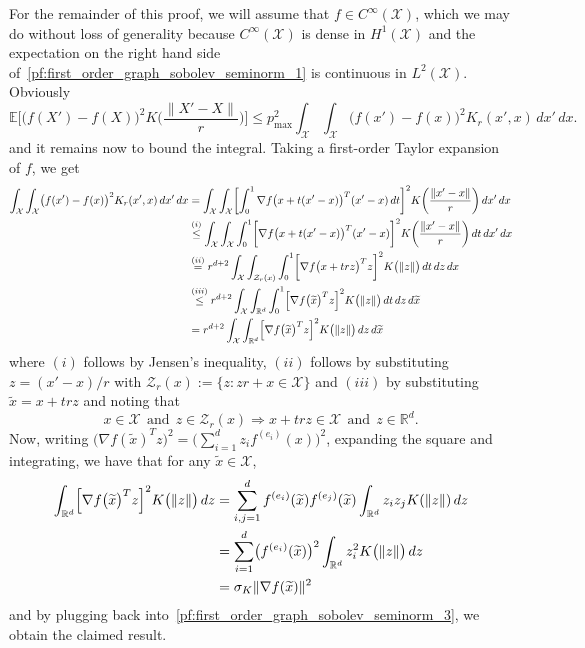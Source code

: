 \documentclass{article}
\newcommand{\Reals}{\mathbb{R}}
\newcommand{\1}{\mathbf{1}}
\newcommand{\Rd}{\Reals^d}
\newcommand{\Xset}{\mathcal{X}}
\newcommand{\Leb}{L}
\newcommand{\mc}[1]{\mathcal{#1}}
\newcommand{\Ebb}{\mathbb{E}}
\newcommand{\wt}[1]{\widetilde{#1}}
\theoremstyle{alden}
\theoremstyle{aldenthm}
\theoremstyle{definition}
\theoremstyle{remark}
\begin{document}
For the remainder of this proof, we will assume that $f \in C^{\infty}(\Xset)$, which we may do without loss of generality because $C^{\infty}(\Xset)$ is dense in $H^1(\Xset)$ and the expectation on the right hand side of~\eqref{pf:first_order_graph_sobolev_seminorm_1} is continuous in $\Leb^2(\Xset)$. Obviously
\begin{equation}
\Ebb\biggl[\bigl(f(X') - f(X)\bigr)^2K\biggl(\frac{\|X' - X\|}{r}\biggr)\biggr] \leq p_{\max}^2 \int_{\Xset} \int_{\Xset} \bigl(f(x') - f(x)\bigr)^2 K_r(x',x) \,dx' \,dx. \label{pf:first_order_graph_sobolev_seminorm_2}
\end{equation}
and it remains now to bound the integral. Taking a first-order Taylor expansion of $f$, we get
\begin{align}
\int_{\Xset} \int_{\Xset} \bigl(f(x') - f(x)\bigr)^2 K_r(x',x) \,dx' \,dx & = \int_{\Xset} \int_{\Xset} \biggl[\int_{0}^{1} \nabla f\bigl(x + t(x' - x)\bigr)^T (x' - x)\,dt\biggr]^2 K\biggl(\frac{\|x' - x\|}{r}\biggr) \,dx' \,dx \nonumber \\
& \overset{(i)}{\leq} \int_{\Xset} \int_{\Xset} \int_{0}^{1} \biggl[\nabla f\bigl(x + t(x' - x)\bigr)^T (x' - x)\biggr]^2 K\biggl(\frac{\|x' - x\|}{r}\biggr) \,dt\,dx' \,dx \nonumber \\
& \overset{(ii)}{=} r^{d + 2} \int_{\Xset} \int_{\mc{Z}_r(x)} \int_{0}^{1} \biggl[\nabla f\bigl(x + trz\bigr)^T z\biggr]^2 K\bigl(\|z\|\bigr) \,dt\,dz \,dx \\
&  \overset{(iii)}{\leq} r^{d + 2} \int_{\Xset} \int_{\Reals^d} \int_{0}^{1} \Bigl[\nabla f\bigl(\wt{x}\bigr)^T z\Bigr]^2 K\bigl(\|z\|\bigr) \,dt \,dz \,d\wt{x} \nonumber \\
& = r^{d + 2} \int_{\Xset} \int_{\Reals^d} \Bigl[\nabla f\bigl(\wt{x}\bigr)^T z\Bigr]^2 K\bigl(\|z\|\bigr) \,dz \,d\wt{x} \label{pf:first_order_graph_sobolev_seminorm_3}
\end{align}
where $(i)$ follows by Jensen's inequality, $(ii)$ follows by substituting $z = (x' - x)/r$ with $\mc{Z}_r(x) := \{z: zr + x \in \Xset\}$ and $(iii)$ by substituting $\wt{x} = x + trz$ and noting that
\begin{equation*}
x \in \Xset ~~\textrm{and}~~ z \in \mc{Z}_r(x) \Longrightarrow x + trz \in \Xset ~~\textrm{and}~~ z \in \Reals^d.
\end{equation*}
Now, writing $\bigl(\nabla f(\wt{x}) ^T z\bigr)^2 = \bigl(\sum_{i = 1}^{d} z_{i} f^{(e_i)}(x) \bigr)^2$, expanding the square and integrating, we have that for any $\wt{x} \in \Xset$,
\begin{align*}
\int_{\Reals^d} \Bigl[\nabla f\bigl(\wt{x}\bigr)^T z\Bigr]^2 K\bigl(\|z\|\bigr) \,dz & = \sum_{i,j = 1}^{d} f^{(e_i)}(\wt{x}) f^{(e_j)}(\wt{x}) \int_{\Rd} z_iz_jK(\|z\|) \,dz \\
& = \sum_{i = 1}^{d} \bigl(f^{(e_i)}(\wt{x})\bigr)^2 \int_{\Rd} z_i^2 K\bigl(\|z\|\bigr) \,dz \\
& = \sigma_K \|\nabla f(\wt{x})\|^2
\end{align*}
and by plugging back into~\eqref{pf:first_order_graph_sobolev_seminorm_3}, we obtain the claimed result. 
\end{document}
